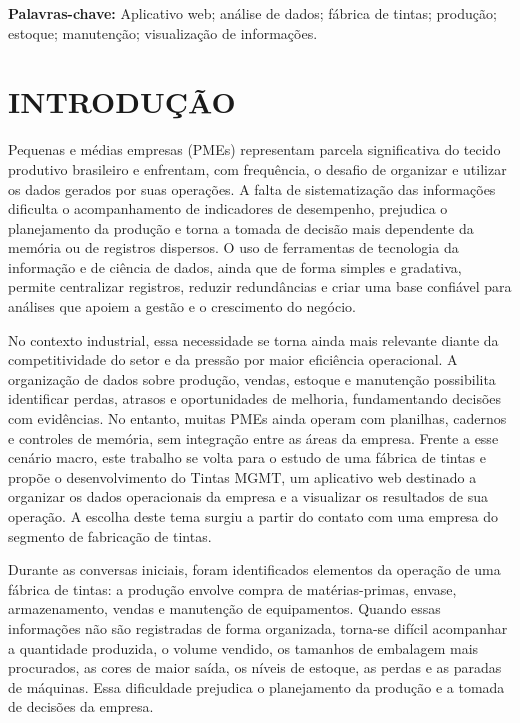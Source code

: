 \documentclass[12pt,a4paper]{article}
\begin{document}
\vspace{2cm}

\textbf{Palavras-chave:} Aplicativo web; análise de dados; fábrica de tintas; produção; estoque; manutenção; visualização de informações.

\clearpage
\listoffigures

\clearpage
\tableofcontents

\clearpage
\pagestyle{fancy}
\section{INTRODUÇÃO}
\enlargethispage{-4\baselineskip}
Pequenas e médias empresas (PMEs) representam parcela significativa do tecido produtivo brasileiro e enfrentam, com frequência, o desafio de organizar e utilizar os dados gerados por suas operações. A falta de sistematização das informações dificulta o acompanhamento de indicadores de desempenho, prejudica o planejamento da produção e torna a tomada de decisão mais dependente da memória ou de registros dispersos. O uso de ferramentas de tecnologia da informação e de ciência de dados, ainda que de forma simples e gradativa, permite centralizar registros, reduzir redundâncias e criar uma base confiável para análises que apoiem a gestão e o crescimento do negócio.

No contexto industrial, essa necessidade se torna ainda mais relevante diante da competitividade do setor e da pressão por maior eficiência operacional. A organização de dados sobre produção, vendas, estoque e manutenção possibilita identificar perdas, atrasos e oportunidades de melhoria, fundamentando decisões com evidências. No entanto, muitas PMEs ainda operam com planilhas, cadernos e controles de memória, sem integração entre as áreas da empresa. Frente a esse cenário macro, este trabalho se volta para o estudo de uma fábrica de tintas e propõe o desenvolvimento do Tintas MGMT, um aplicativo web destinado a organizar os dados operacionais da empresa e a visualizar os resultados de sua operação. A escolha deste tema surgiu a partir do contato com uma empresa do segmento de fabricação de tintas.

Durante as conversas iniciais, foram identificados elementos da operação de uma fábrica de tintas: a produção envolve compra de matérias-primas, envase, armazenamento, vendas e manutenção de equipamentos. Quando essas informações não são registradas de forma organizada, torna-se difícil acompanhar a quantidade produzida, o volume vendido, os tamanhos de embalagem mais procurados, as cores de maior saída, os níveis de estoque, as perdas e as paradas de máquinas. Essa dificuldade prejudica o planejamento da produção e a tomada de decisões da empresa.
\end{document}
